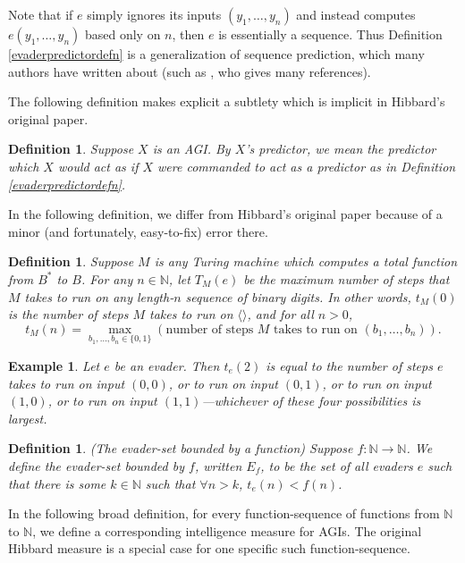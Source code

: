 \documentclass{article}
\newtheorem{definition}[theorem]{Definition}
\newtheorem{example}[theorem]{Example}
\begin{document}
Note that if $e$ simply ignores its inputs $(y_1,\ldots,y_n)$ and instead
computes $e(y_1,\ldots,y_n)$ based only on $n$, then $e$ is essentially a sequence.
Thus Definition \ref{evaderpredictordefn} is a generalization of sequence prediction,
which many authors have written about (such as \cite{legg2006there}, who gives many
references).

The following definition makes explicit a subtlety which is implicit in Hibbard's
original paper.

\begin{definition}
\label{Xspredictordefn}
    Suppose $X$ is an AGI. By \emph{$X$'s predictor}, we mean the predictor which
    $X$ would act as if $X$ were commanded to act as a predictor as in
    Definition \ref{evaderpredictordefn}.
\end{definition}

In the following definition, we differ from Hibbard's original paper
because of a minor (and fortunately, easy-to-fix) error there.

\begin{definition}
\label{tsubedefinition}
    Suppose $M$ is any Turing machine which computes a total function from $B^*$ to $B$.
    For any $n\in\mathbb N$, let $T_M(e)$ be the maximum number of steps that $M$ takes
    to run on any length-$n$ sequence of binary digits.
    In other words, $t_M(0)$ is the number of steps $M$ takes to run on $\langle\rangle$,
    and for all $n>0$,
    \[
        t_M(n) = \max_{b_1,\ldots,b_n\in \{0,1\}}
        (\text{number of steps $M$ takes to run on $(b_1,\ldots,b_n)$}).
    \]
\end{definition}

\begin{example}
    Let $e$ be an evader. Then
    $t_e(2)$ is equal to the number of steps $e$ takes to run on input
    $(0,0)$, or to run on input $(0,1)$, or to run on input $(1,0)$, or to run on input
    $(1,1)$---whichever of these four possibilities is largest.
\end{example}

\begin{definition}
\label{evadersetdefinition}
    (The evader-set bounded by a function)
    Suppose $f:\mathbb N\to\mathbb N$. We define the \emph{evader-set bounded by $f$},
    written $E_f$, to be the set of all evaders $e$ such that
    there is some $k\in\mathbb N$ such that $\forall n>k$,
    $t_e(n)<f(n)$.
\end{definition}

In the following broad definition, for every function-sequence of functions
from $\mathbb N$ to $\mathbb N$, we define a corresponding intelligence measure
for AGIs.
The original Hibbard measure is a special case for one specific
such function-sequence.
\end{document}
